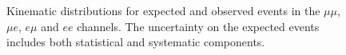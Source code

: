 \begin{figure}[!hbtp]
\begin{center}
\caption{Kinematic distributions for expected and observed events in the  $\mu\mu$, $\mu{e}$, $e\mu$ and $ee$ channels.
The uncertainty on the expected events includes both statistical and systematic components.}
\label{fig:inclplots}
\end{center}
\end{figure}




